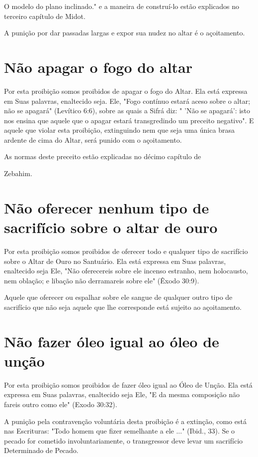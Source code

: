 \begin{itemize}
\begin{enumrate}
\begin{itemize}
\begin{itemize}
\begin{itemize}
O modelo do plano inclinado." e a maneira de
construí-lo estão ex­plicados no terceiro capítulo de Midot.

A punição por dar passadas largas e expor sua nudez no altar é o
açoitamento.

\section{Não apagar o fogo do altar}

Por esta proibição somos proibidos de apagar o fogo do Altar. Ela está
expressa em Suas palavras, enaltecido seja. Ele, "Fogo contínuo estará
ace­so sobre o altar; não se apagará" (Levítico 6:6), sobre as quais a
Sifrá diz: " 'Não se apagará': isto nos ensina que aquele que o apagar
estará transgredindo um preceito negativo". E aquele que violar esta
proibição, extinguindo nem que seja uma única brasa ardente de cima do
Altar, será punido com o açoitamento.


As normas deste preceito estão explicadas no décimo capítulo de


Zebahim.

\section{Não oferecer nenhum tipo de sacrifício sobre o altar de ouro}

Por esta proibição somos proibidos de oferecer todo e qualquer ti­po de
sacrifício sobre o Altar de Ouro no Santuário. Ela está expressa em Suas
palavras, enaltecido seja Ele, "Não oferecereis sobre ele incenso
estranho, nem holocausto, nem oblação; e libação não derramareis sobre
ele" (Êxodo 30:9).

Aquele que oferecer ou espalhar sobre ele sangue de qualquer outro tipo
de sacrifício que não seja aquele que lhe corresponde está sujeito ao
açoitamento.

\section{Não fazer óleo igual ao óleo de unção}

Por esta proibição somos proibidos de fazer óleo igual ao Óleo de Unção.
Ela está expressa em Suas palavras, enaltecido seja Ele, "E da mesma
composição não fareis outro como ele" (Exodo 30:32).

A punição pela contravenção voluntária desta proibição é a extin­ção,
como está nas Escrituras: "Todo homem que fizer semelhante a ele ..."
(Ibid., 33). Se o pecado for cometido involuntariamente, o transgressor
deve levar um sacrifício Determinado de Pecado.



\end{itemize}
\end{itemize}
\end{itemize}
\end{enumrate}
\end{itemize}
